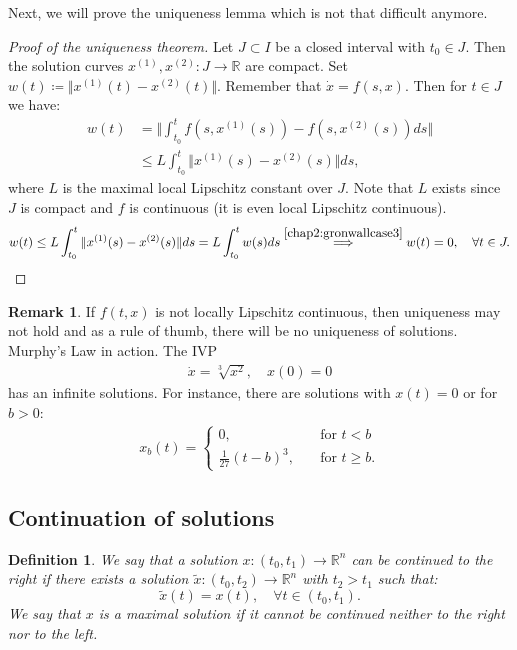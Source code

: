 \documentclass[hidelinks,a4paper, 11pt]{article}
\theoremstyle{plain}
\theoremstyle{break}
\theoremstyle{plain}
\newtheorem{definition}[theorem]{Definition}
\theoremstyle{definition}
\newtheorem*{remark}{Remark}
\begin{document}
Next, we will prove the uniqueness lemma which is not that difficult anymore.
\begin{proof}[Proof of the uniqueness theorem]
	Let $J \subset I$ be a closed interval with $t_0 \in J$. Then the solution curves $x^{(1)}, x^{(2)}: J \to \mathbb R$ are compact. Set $w(t) \coloneqq \Vert x^{(1)}(t)-x^{(2)}(t) \Vert$. Remember that $\dot x = f(s,x)$. Then for $t \in J$ we have:
	\begin{align*}
		w(t) &= \Vert \int^t_{t_0} f(s, x^{(1)}(s)) - f(s,x^{(2)}(s)) ds \Vert \\
		&\leq L \int^t_{t_0}\Vert x^{(1)}(s) - x^{(2)}(s) \Vert ds,
	\end{align*}
	where $L$ is the maximal local Lipschitz constant over $J$. Note that $L$ exists since $J$ is compact and $f$ is continuous (it is even local Lipschitz continuous).
	\[
		w(t) \leq L \int^t_{t_0}\Vert x^{(1)}(s) - x^{(2)}(s) \Vert ds = L \int^t_{t_0}w(s)ds \overset{\eqref{chap2:gronwallcase3}}{\implies} w(t) = 0, \quad \forall t \in J.
	\]
\end{proof}

\begin{remark}
	If $f(t,x)$ is not locally Lipschitz continuous, then uniqueness may not hold and as a rule of thumb, there will be no uniqueness of solutions. Murphy's Law in action. The IVP 
	\begin{align}\label{chap2:nouniqueness}
		\dot x = \sqrt[3]{x^2}, \quad x(0) = 0
	\end{align}
	has an infinite solutions. For instance, there are solutions with $x(t) = 0$ or for $b > 0$:
	\begin{align*}
		x_b(t) = \begin{cases}
		0, \quad & \text{for $t < b$} \\
		\frac{1}{27}(t-b)^3, \quad & \text{for $t \geq b$}.
		\end{cases}
	\end{align*}
\end{remark}

\subsection[Continuation of Solutions]{Continuation of solutions}
\begin{definition}
	We say that a solution $x: (t_0,t_1) \to \mathbb R^n$ can be \emph{continued} to the right if there exists a solution $\tilde x : (t_0,t_2) \to \mathbb R^n$ with $t_2 > t_1$ such that:
	\[
		\tilde x(t) = x(t), \quad \forall t \in (t_0,t_1).
	\]
	We say that $x$ is a \emph{maximal} solution if it cannot be continued neither to the right nor to the left.
\end{definition}
\end{document}
